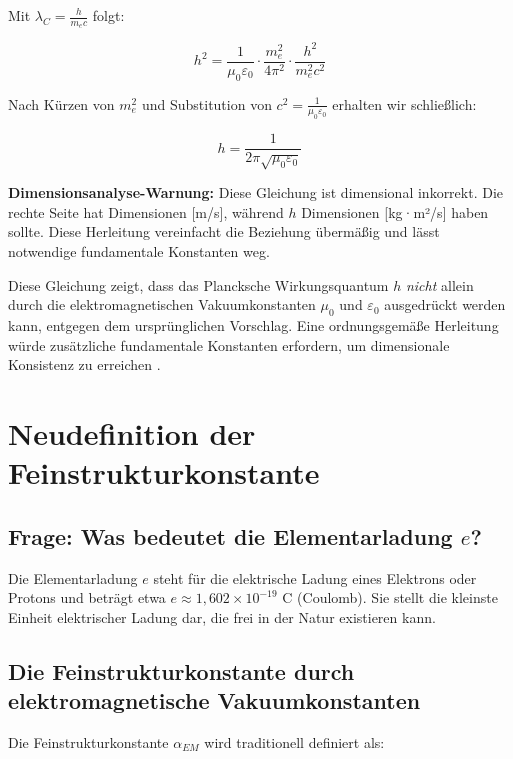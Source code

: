 \documentclass[12pt,a4paper]{article}
\begin{document}
	Mit $\lambda_C = \frac{h}{m_e c}$ folgt:
	
	\begin{equation}
		h^2 = \frac{1}{\mu_0\varepsilon_0} \cdot \frac{m_e^2}{4\pi^2} \cdot \frac{h^2}{m_e^2c^2}
	\end{equation}
	
	Nach Kürzen von $m_e^2$ und Substitution von $c^2 = \frac{1}{\mu_0\varepsilon_0}$ erhalten wir schließlich:
	
	\begin{equation}
		h = \frac{1}{2\pi\sqrt{\mu_0\varepsilon_0}}
	\end{equation}
	
	\textbf{Dimensionsanalyse-Warnung:} Diese Gleichung ist dimensional inkorrekt. Die rechte Seite hat Dimensionen [m/s], während $h$ Dimensionen [kg·m²/s] haben sollte. Diese Herleitung vereinfacht die Beziehung übermäßig und lässt notwendige fundamentale Konstanten weg.
	
	Diese Gleichung zeigt, dass das Plancksche Wirkungsquantum $h$ \textit{nicht} allein durch die elektromagnetischen Vakuumkonstanten $\mu_0$ und $\varepsilon_0$ ausgedrückt werden kann, entgegen dem ursprünglichen Vorschlag. Eine ordnungsgemäße Herleitung würde zusätzliche fundamentale Konstanten erfordern, um dimensionale Konsistenz zu erreichen \cite{Planck1900}.
	
	\section{Neudefinition der Feinstrukturkonstante}
	
	\subsection{Frage: Was bedeutet die Elementarladung $e$?}
	
	Die Elementarladung $e$ steht für die elektrische Ladung eines Elektrons oder Protons und beträgt etwa $e \approx 1,602 \times 10^{-19}$ C (Coulomb). Sie stellt die kleinste Einheit elektrischer Ladung dar, die frei in der Natur existieren kann.
	
	\subsection{Die Feinstrukturkonstante durch elektromagnetische Vakuumkonstanten}
	
	Die Feinstrukturkonstante $\alpha_{EM}$ wird traditionell definiert als:
	
\end{document}
